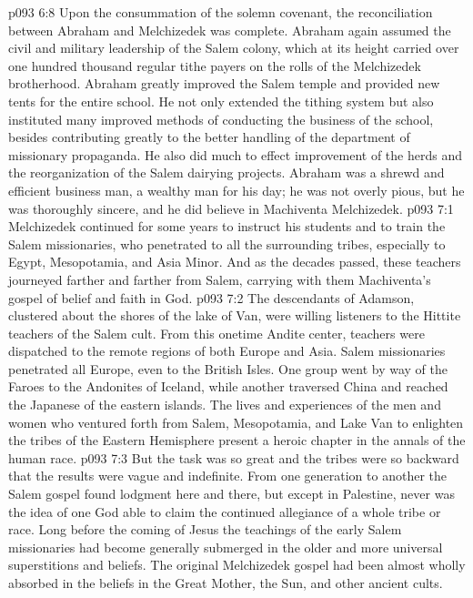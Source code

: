 \vs p093 6:8 Upon the consummation of the solemn covenant, the reconciliation between Abraham and Melchizedek was complete. Abraham again assumed the civil and military leadership of the Salem colony, which at its height carried over one hundred thousand regular tithe payers on the rolls of the Melchizedek brotherhood. Abraham greatly improved the Salem temple and provided new tents for the entire school. He not only extended the tithing system but also instituted many improved methods of conducting the business of the school, besides contributing greatly to the better handling of the department of missionary propaganda. He also did much to effect improvement of the herds and the reorganization of the Salem dairying projects. Abraham was a shrewd and efficient business man, a wealthy man for his day; he was not overly pious, but he was thoroughly sincere, and he did believe in Machiventa Melchizedek.
\vs p093 7:1 Melchizedek continued for some years to instruct his students and to train the Salem missionaries, who penetrated to all the surrounding tribes, especially to Egypt, Mesopotamia, and Asia Minor. And as the decades passed, these teachers journeyed farther and farther from Salem, carrying with them Machiventa’s gospel of belief and faith in God.\plusone
\vs p093 7:2 The descendants of Adamson, clustered about the shores of the lake of Van, were willing listeners to the Hittite teachers of the Salem cult. From this onetime Andite center, teachers were dispatched to the remote regions of both Europe and Asia. Salem missionaries penetrated all Europe, even to the British Isles. One group went by way of the Faroes to the Andonites of Iceland, while another traversed China and reached the Japanese of the eastern islands. The lives and experiences of the men and women who ventured forth from Salem, Mesopotamia, and Lake Van to enlighten the tribes of the Eastern Hemisphere present a heroic chapter in the annals of the human race.\plusone
\vs p093 7:3 But the task was so great and the tribes were so backward that the results were vague and indefinite. From one generation to another the Salem gospel found lodgment here and there, but except in Palestine, never was the idea of one God able to claim the continued allegiance of a whole tribe or race. Long before the coming of Jesus the teachings of the early Salem missionaries had become generally submerged in the older and more universal superstitions and beliefs. The original Melchizedek gospel had been almost wholly absorbed in the beliefs in the Great Mother, the Sun, and other ancient cults.
